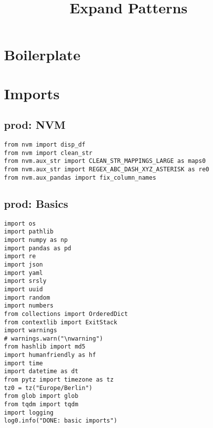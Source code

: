 \documentclass[a4paper,10pt,onecolumn,oneside,openright]{article}
\date{}
\title{Expand Patterns}
\begin{document}
\maketitle

\section{Boilerplate}
\label{sec:orgba3b580}
\section{Imports}
\label{sec:org7583c97}
\subsection{prod: NVM}
\label{sec:org13cb1d0}
\begin{verbatim}
from nvm import disp_df
from nvm import clean_str
from nvm.aux_str import CLEAN_STR_MAPPINGS_LARGE as maps0
from nvm.aux_str import REGEX_ABC_DASH_XYZ_ASTERISK as re0
from nvm.aux_pandas import fix_column_names
\end{verbatim}

\subsection{prod: Basics}
\label{sec:org43b2e3b}
\begin{verbatim}
import os
import pathlib
import numpy as np
import pandas as pd
import re
import json
import yaml
import srsly
import uuid
import random
import numbers
from collections import OrderedDict
from contextlib import ExitStack
import warnings
# warnings.warn("\nwarning")
from hashlib import md5
import humanfriendly as hf
import time
import datetime as dt
from pytz import timezone as tz
tz0 = tz("Europe/Berlin")
from glob import glob
from tqdm import tqdm
import logging
log0.info("DONE: basic imports")
\end{verbatim}
\end{document}
